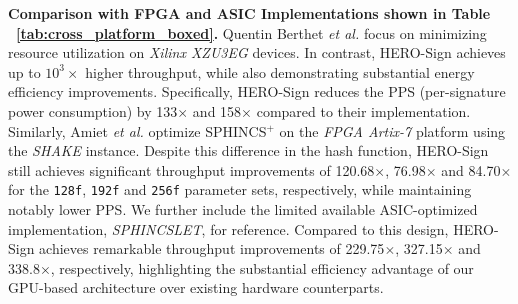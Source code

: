 \documentclass[10pt,conference]{IEEEtran}
\begin{document}
\textbf{Comparison with FPGA and ASIC Implementations shown in Table ~\ref{tab:cross_platform_boxed}.}
Quentin Berthet \textit{et al.} focus on minimizing resource utilization on \textit{Xilinx XZU3EG} devices\cite{berthet2021area}. 
In contrast, HERO-Sign achieves up to \textbf{$10^3\times$} higher throughput, while also demonstrating substantial energy efficiency improvements. 
Specifically, HERO-Sign reduces the PPS (per-signature power consumption) by 133$\times$ and 158$\times$ compared to their implementation. 
Similarly, Amiet \textit{et al.} optimize SPHINCS$^+$ on the \textit{FPGA Artix-7} platform using the \textit{SHAKE} instance\cite{amiet2018fpga}. 
Despite this difference in the hash function, HERO-Sign still achieves significant throughput improvements of 120.68$\times$, 76.98$\times$ and 84.70$\times$ for the \texttt{128f}, \texttt{192f} and \texttt{256f} parameter sets, respectively, 
while maintaining notably lower PPS. We further include the limited available ASIC-optimized implementation, \textit{SPHINCSLET}, for reference\cite{10.1145/3728469}. 
Compared to this design, HERO-Sign achieves remarkable throughput improvements of 
229.75$\times$, 327.15$\times$ and 338.8$\times$, respectively, 
highlighting the substantial efficiency advantage of our GPU-based architecture over existing hardware counterparts.

\begin{table}[t]
\centering
\caption{Cross-Platform Comparison of SPHINCS$^+$ Variants (Throughput(KOPS), PPS(Watt)). PPS: Power Consumption Per signature.}
\label{tab:cross_platform_boxed}
\end{table}
\end{document}
